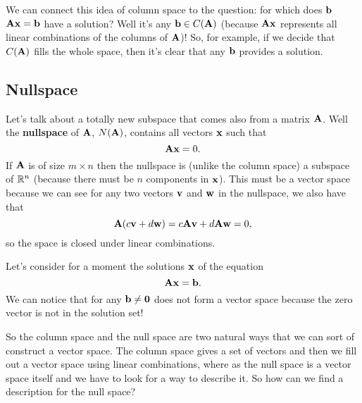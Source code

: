 
We can connect this idea of column space to the question: for which does $\boldsymbol{\mathbf{b}}$ $\boldsymbol{\mathbf{A}}\boldsymbol{\mathbf{x}}=\boldsymbol{\mathbf{b}}$ have a solution? Well it's any $\boldsymbol{\mathbf{b}} \in C(\boldsymbol{\mathbf{A}})$ (because $\boldsymbol{\mathbf{A}}\boldsymbol{\mathbf{x}}$ represents all linear combinations of the columns of $\boldsymbol{\mathbf{A}}$)! So, for example, if we decide that $C(\boldsymbol{\mathbf{A}})$ fills the whole space, then it's clear that any $\boldsymbol{\mathbf{b}}$ provides a solution. 

\subsection{Nullspace}

Let's talk about a totally new subspace that comes also from a matrix $\boldsymbol{\mathbf{A}}$. Well the \textbf{nullspace} of $\boldsymbol{\mathbf{A}}$, $N(\boldsymbol{\mathbf{A}})$, contains all vectors $\boldsymbol{\mathbf{x}}$ such that
\[ \boldsymbol{\mathbf{A}}\boldsymbol{\mathbf{x}} = 0. \]
If $\boldsymbol{\mathbf{A}}$ is of size $m \times n$ then the nullspace is (unlike the column space) a subspace of $\mathbb{R}^n$ (because there must be $n$ components in $\boldsymbol{\mathbf{x}}$). This must be a vector space because we can see for any two vectors $\boldsymbol{\mathbf{v}}$ and $\boldsymbol{\mathbf{w}}$ in the nullspace, we also have that
\[ \boldsymbol{\mathbf{A}}(c\boldsymbol{\mathbf{v}} + d\boldsymbol{\mathbf{w}}) = c\boldsymbol{\mathbf{A}}\boldsymbol{\mathbf{v}} + d\boldsymbol{\mathbf{A}}\boldsymbol{\mathbf{w}} = 0, \]
so the space is closed under linear combinations. 

Let's consider for a moment the solutions $\boldsymbol{\mathbf{x}}$ of the equation
\[ \boldsymbol{\mathbf{A}}\boldsymbol{\mathbf{x}} = \boldsymbol{\mathbf{b}}. \]
We can notice that for any $\boldsymbol{\mathbf{b}} \ne \boldsymbol{\mathbf{0}}$ does not form a vector space because the zero vector is not in the solution set! 

So the column space and the null space are two natural ways that we can sort of construct a vector space. The column space gives a set of vectors and then we fill out a vector space using linear combinations, where as the null space is a vector space itself and we have to look for a way to describe it. So how can we find a description for the null space? 